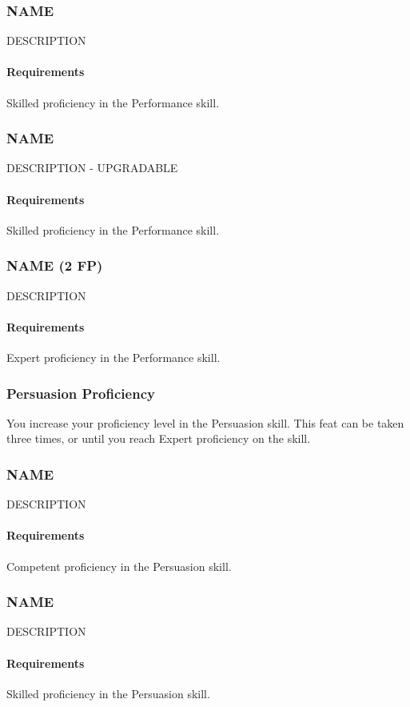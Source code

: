 \subsubsection{NAME} \label{feat::name}
    DESCRIPTION
    \paragraph{Requirements} Skilled proficiency in the Performance skill.
\subsubsection{NAME} \label{feat::name}
    DESCRIPTION - UPGRADABLE
    \paragraph{Requirements} Skilled proficiency in the Performance skill.
\subsubsection{NAME (2 FP)} \label{feat::name}
    DESCRIPTION
    \paragraph{Requirements} Expert proficiency in the Performance skill.
\subsubsection{Persuasion Proficiency} \label{feat::persuasionprof}
    You increase your proficiency level in the Persuasion skill.
    This feat can be taken three times, or until you reach Expert proficiency on the skill.
\subsubsection{NAME} \label{feat::name}
    DESCRIPTION
    \paragraph{Requirements} Competent proficiency in the Persuasion skill.
\subsubsection{NAME} \label{feat::name}
    DESCRIPTION
    \paragraph{Requirements} Skilled proficiency in the Persuasion skill.
